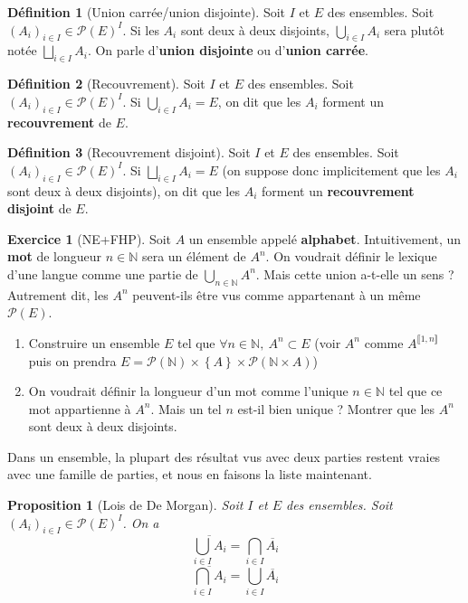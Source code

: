 \documentclass[french]{book}
\newcommand{\N}{\mathbb{N}}
\theoremstyle{plain}
\newtheorem{prop}{Proposition}[chapter]
\theoremstyle{definition}
\newtheorem{dfn}{Définition}[chapter]
\newtheorem{exe}{Exercice}[chapter]
\theoremstyle{remark}
\begin{document}
\begin{dfn}[Union carrée/union disjointe]
	Soit $I$ et $E$ des ensembles. Soit $(A_i)_{i\in I}\in\mathcal{P}(E)^I$. Si les $A_i$ sont deux à deux disjoints, $\displaystyle\bigcup_{i\in I}A_i$ sera plutôt notée $\displaystyle\bigsqcup_{i\in I}A_i$. On parle d'\textbf{union disjointe} ou d'\textbf{union carrée}.
\end{dfn}
\begin{dfn}[Recouvrement]
	Soit $I$ et $E$ des ensembles. Soit $(A_i)_{i\in I}\in\mathcal{P}(E)^I$. Si $\displaystyle\bigcup_{i\in I}A_i=E$, on dit que les $A_i$ forment un \textbf{recouvrement} de $E$.
\end{dfn}
\begin{dfn}[Recouvrement disjoint]
	Soit $I$ et $E$ des ensembles. Soit $(A_i)_{i\in I}\in\mathcal{P}(E)^I$. Si $\displaystyle\bigsqcup_{i\in I}A_i=E$ (on suppose donc implicitement que les $A_i$ sont deux à deux disjoints), on dit que les $A_i$ forment un \textbf{recouvrement disjoint} de $E$.
\end{dfn}
\begin{exe}[NE+FHP]
	Soit $A$ un ensemble appelé \textbf{alphabet}. Intuitivement, un \textbf{mot} de longueur $n\in\N$ sera un élément de $A^n$. On voudrait définir le lexique d'une langue comme une partie de $\displaystyle\bigcup_{n\in\N}A^n$. Mais cette union a-t-elle un sens ? Autrement dit, les $A^n$ peuvent-ils être vus comme appartenant à un même $\mathcal{P}(E)$.
	\begin{enumerate}
		\item Construire un ensemble $E$ tel que $\forall n\in\N,\ A^n\subset E$ (voir $A^n$ comme $A^{\llbracket1,n\rrbracket}$ puis on prendra $E=\mathcal{P}(\N)\times\left\{A\right\}\times\mathcal{P}(\N\times A)$)
		\item On voudrait définir la longueur d'un mot comme l'unique $n\in\N$ tel que ce mot appartienne à $A^n$. Mais un tel $n$ est-il bien unique ? Montrer que les $A^n$ sont deux à deux disjoints.
	\end{enumerate}
\end{exe}
Dans un ensemble, la plupart des résultat vus avec deux parties restent vraies avec une famille de parties, et nous en faisons la liste maintenant.
\begin{prop}[Lois de De Morgan]
	Soit $I$ et $E$ des ensembles. Soit $(A_i)_{i\in I}\in\mathcal{P}(E)^I$. On a $$\overline{\bigcup_{i\in I}A_i}=\bigcap_{i\in I}\overline{A_i}$$ $$\overline{\bigcap_{i\in I}A_i}=\bigcup_{i\in I}\overline{A_i}$$
\end{prop}
\end{document}
